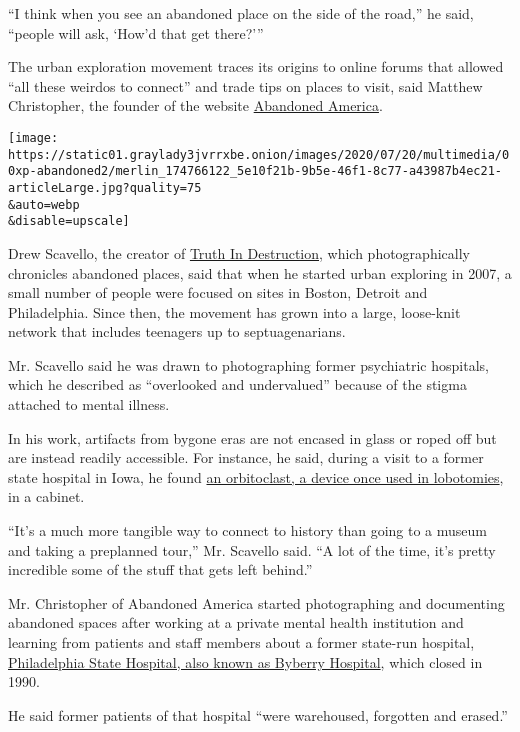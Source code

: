 ``I think when you see an abandoned place on the side of the road,'' he
said, ``people will ask, `How'd that get there?'''

The urban exploration movement traces its origins to online forums that
allowed ``all these weirdos to connect'' and trade tips on places to
visit, said Matthew Christopher, the founder of the website
\href{https://www.abandonedamerica.us/}{Abandoned America}.

\texttt{[image: https://static01.graylady3jvrrxbe.onion/images/2020/07/20/multimedia/00xp-abandoned2/merlin\_174766122\_5e10f21b-9b5e-46f1-8c77-a43987b4ec21-articleLarge.jpg?quality=75\\\&auto=webp\\\&disable=upscale]}

Drew Scavello, the creator of
\href{https://www.facebookcorewwwi.onion/pg/truthindestructionphotography/photos/}{Truth
In Destruction}, which photographically chronicles abandoned places,
said that when he started urban exploring in 2007, a small number of
people were focused on sites in Boston, Detroit and Philadelphia. Since
then, the movement has grown into a large, loose-knit network that
includes teenagers up to septuagenarians.

Mr. Scavello said he was drawn to photographing former psychiatric
hospitals, which he described as ``overlooked and undervalued'' because
of the stigma attached to mental illness.

In his work, artifacts from bygone eras are not encased in glass or
roped off but are instead readily accessible. For instance, he said,
during a visit to a former state hospital in Iowa, he found
\href{https://warehouse-13-artifact-database.fandom.com/wiki/Walter_Freeman\%27s_Orbitoclast}{an
orbitoclast, a device once used in lobotomies}, in a cabinet.

``It's a much more tangible way to connect to history than going to a
museum and taking a preplanned tour,'' Mr. Scavello said. ``A lot of the
time, it's pretty incredible some of the stuff that gets left behind.''

Mr. Christopher of Abandoned America started photographing and
documenting abandoned spaces after working at a private mental health
institution and learning from patients and staff members about a former
state-run hospital,
\href{https://www.phillymag.com/news/2015/06/28/byberry-mental-institution-survivors/}{Philadelphia
State Hospital, also known as Byberry Hospital}, which closed in 1990.

He said former patients of that hospital ``were warehoused, forgotten
and erased.''

